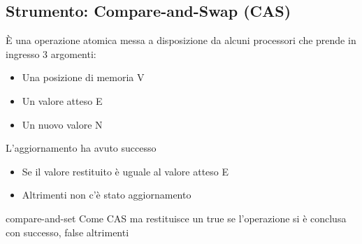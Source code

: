 \subsection{Strumento: Compare-and-Swap (CAS)}
È una operazione atomica messa a disposizione da alcuni processori che prende in ingresso 3 argomenti:
\begin{itemize}
    \item Una posizione di memoria V
    \item Un valore atteso E
    \item Un nuovo valore N
\end{itemize}
L'aggiornamento ha avuto successo
\begin{itemize}
    \item Se il valore restituito è uguale al valore atteso E
    \item Altrimenti non c'è stato aggiornamento
\end{itemize}
compare-and-set
Come CAS ma restituisce un true se
l'operazione si è conclusa con successo, false
altrimenti







